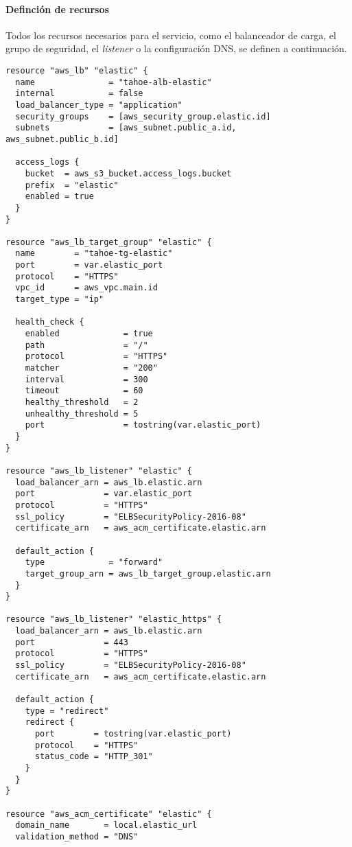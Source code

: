\newpage{}
\paragraph{Definción de recursos}
Todos los recursos necesarios para el servicio, como el balanceador de carga, el
grupo de seguridad, el \textit{listener} o la configuración DNS, se definen a
continuación.

\begin{lstlisting}[caption={Definción de recursos de Elastic}, label={lst:elastic_resources}]
resource "aws_lb" "elastic" {
  name               = "tahoe-alb-elastic"
  internal           = false
  load_balancer_type = "application"
  security_groups    = [aws_security_group.elastic.id]
  subnets            = [aws_subnet.public_a.id, aws_subnet.public_b.id]

  access_logs {
    bucket  = aws_s3_bucket.access_logs.bucket
    prefix  = "elastic"
    enabled = true
  }
}

resource "aws_lb_target_group" "elastic" {
  name        = "tahoe-tg-elastic"
  port        = var.elastic_port
  protocol    = "HTTPS"
  vpc_id      = aws_vpc.main.id
  target_type = "ip"

  health_check {
    enabled             = true
    path                = "/"
    protocol            = "HTTPS"
    matcher             = "200"
    interval            = 300
    timeout             = 60
    healthy_threshold   = 2
    unhealthy_threshold = 5
    port                = tostring(var.elastic_port)
  }
}

resource "aws_lb_listener" "elastic" {
  load_balancer_arn = aws_lb.elastic.arn
  port              = var.elastic_port
  protocol          = "HTTPS"
  ssl_policy        = "ELBSecurityPolicy-2016-08"
  certificate_arn   = aws_acm_certificate.elastic.arn

  default_action {
    type             = "forward"
    target_group_arn = aws_lb_target_group.elastic.arn
  }
}

resource "aws_lb_listener" "elastic_https" {
  load_balancer_arn = aws_lb.elastic.arn
  port              = 443
  protocol          = "HTTPS"
  ssl_policy        = "ELBSecurityPolicy-2016-08"
  certificate_arn   = aws_acm_certificate.elastic.arn

  default_action {
    type = "redirect"
    redirect {
      port        = tostring(var.elastic_port)
      protocol    = "HTTPS"
      status_code = "HTTP_301"
    }
  }
}

resource "aws_acm_certificate" "elastic" {
  domain_name       = local.elastic_url
  validation_method = "DNS"


\end{lstlisting}
